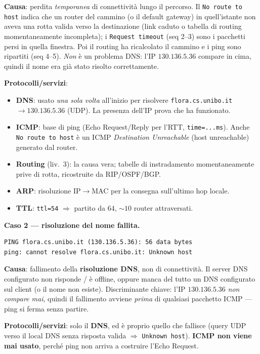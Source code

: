 \documentclass[11pt,a4paper]{report}
\begin{document}
\textbf{Causa}: perdita \emph{temporanea} di connettività lungo il percorso. Il
\texttt{No route to host} indica che un router del cammino (o il default gateway)
in quell'istante non aveva una rotta valida verso la destinazione (link caduto o
tabella di routing momentaneamente incompleta); i \texttt{Request timeout}
(seq 2--3) sono i pacchetti persi in quella finestra. Poi il routing ha
ricalcolato il cammino e i ping sono ripartiti (seq 4--5). \emph{Non} è un
problema DNS: l'IP $130.136.5.36$ compare in cima, quindi il nome era già stato
risolto correttamente.

\textbf{Protocolli/servizi}:
\begin{itemize}[noitemsep]
    \item \textbf{DNS}: usato \emph{una sola volta} all'inizio per risolvere
    \texttt{flora.cs.unibo.it} $\to 130.136.5.36$ (UDP). La presenza dell'IP
    prova che ha funzionato.
    \item \textbf{ICMP}: base di ping (Echo Request/Reply per l'RTT,
    \texttt{time=...ms}). Anche \texttt{No route to host} è un ICMP
    \emph{Destination Unreachable} (host unreachable) generato dal router.
    \item \textbf{Routing} (liv.~3): la causa vera; tabelle di instradamento
    momentaneamente prive di rotta, ricostruite da RIP/OSPF/BGP.
    \item \textbf{ARP}: risoluzione IP$\to$MAC per la consegna sull'ultimo hop locale.
    \item \textbf{TTL}: \texttt{ttl=54} $\Rightarrow$ partito da $64$, $\sim 10$
    router attraversati.
\end{itemize}

\medskip
\textbf{Caso 2 --- risoluzione del nome fallita.}
\begin{verbatim}
PING flora.cs.unibo.it (130.136.5.36): 56 data bytes
ping: cannot resolve flora.cs.unibo.it: Unknown host
\end{verbatim}

\textbf{Causa}: fallimento della \textbf{risoluzione DNS}, non di connettività.
Il server DNS configurato non risponde / è offline, oppure manca del tutto un DNS
configurato sul client (o il nome non esiste). Discriminante chiave: l'IP
$130.136.5.36$ \emph{non compare mai}, quindi il fallimento avviene \emph{prima}
di qualsiasi pacchetto ICMP --- ping si ferma senza partire.

\textbf{Protocolli/servizi}: solo il \textbf{DNS}, ed è proprio quello che
fallisce (query UDP verso il local DNS senza risposta valida $\Rightarrow$
\texttt{Unknown host}). \textbf{ICMP non viene mai usato}, perché ping non arriva
a costruire l'Echo Request.
\end{document}
